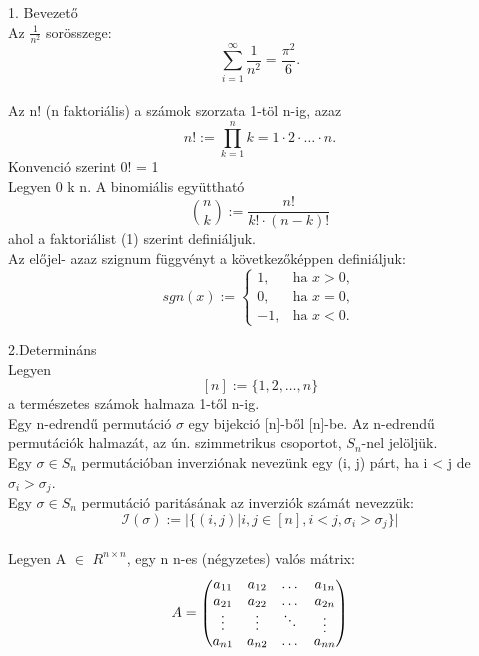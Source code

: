 \documentclass{article}
\begin{document}
{\huge 1. Bevezető}\\

Az $\frac{1}{n^2}$ sorösszege:
\[ \sum_{i=1}^\infty \frac{1}{n^2} = \frac{\pi^2}{6}. \]\\
Az n! (n faktoriális) a számok szorzata 1-töl n-ig, azaz
\[ n! := \prod_{k=1}^n k = 1 \cdot 2 \cdot \dotsc \cdot n.\]
Konvenció szerint 0! = 1\\


Legyen 0   k   n. A binomiális együttható
\[\binom{n}{k} := \frac{n!}{k!\cdot(n-k)!} \]
ahol a faktoriálist (1) szerint definiáljuk.\\

Az előjel- azaz szignum függvényt a következőképpen definiáljuk:
\[sgn(x) :=
\begin{cases}
1, & \text{ha } x > 0, \\
0, & \text{ha } x = 0, \\
-1, & \text{ha } x < 0.
\end{cases}
\]

{\huge 2.Determináns}\\

Legyen
\[[n] := \{1,2, \dotsc , n \} \]
a természetes számok halmaza 1-től n-ig.\\

Egy n-edrendű permutáció $\sigma$ egy bijekció [n]-ből [n]-be. Az n-edrendű permutációk halmazát, az ún. szimmetrikus csoportot, $S_n$-nel jelöljük.\\

Egy $\sigma \in  S_n$ permutációban inverziónak nevezünk egy (i, j) párt, ha i < j
de $\sigma_i > \sigma_j$.\\

Egy $\sigma \in  S_n$ permutáció paritásának az inverziók számát nevezzük:
\[ \mathcal{I} (\sigma) := \vert \{(i, j) \vert i, j \in [n], i < j, \sigma_i > \sigma_j \} \vert \]\\

Legyen A $\in$ $R^{n \times n}$, egy n \texttimes n-es (négyzetes) valós mátrix:\\

\[ A=
\left( \begin{matrix}
a_{11} & a_{12} & \dotsc  & a_{1n} \\
a_{21} & a_{22} &  \dotsc & a_{2n} \\
\rotatebox[origin=c]{90}{$ \dotsc $} & \rotatebox[origin=c]{90}{$ \dotsc $} &  \rotatebox[origin=c]{-45}{$ \dotsc $} & \rotatebox[origin=c]{90}{$ \dotsc $ } \\
a_{n1} & a_{n2} & \dotsc & a_{nn} \\
\end{matrix} \right)
\]\\
\end{document}
